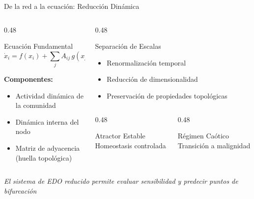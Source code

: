 \documentclass[aspectratio=169]{beamer}
\begin{document}
	\begin{frame}{De la red a la ecuación: Reducción Dinámica}
		\begin{columns}[T]
			\begin{column}{0.48\textwidth}
				\begin{block}{\color{primaryblue}Ecuación Fundamental}
					\begin{equation*}
						\dot{x}_i = f(x_i) + \sum_{j} A_{ij} \, g(x_j, x_i)
					\end{equation*}
				\end{block}
				
				\vspace{0.3cm}
				\textbf{Componentes:}
				\begin{itemize}
					\item Actividad dinámica de la comunidad
					\item Dinámica interna del nodo
					\item Matriz de adyacencia (huella topológica)
				\end{itemize}
			\end{column}
			
			\begin{column}{0.48\textwidth}
				\begin{block}{\color{primaryblue}Separación de Escalas}
					\begin{itemize}
						\item Renormalización temporal
						\item Reducción de dimensionalidad
						\item Preservación de propiedades topológicas
					\end{itemize}
				\end{block}
				
				\vspace{0.3cm}
				\begin{columns}
					\begin{column}{0.48\textwidth}
						\begin{block}{Atractor Estable}
							\footnotesize Homeostasis controlada
						\end{block}
					\end{column}
					\begin{column}{0.48\textwidth}
						\begin{alertblock}{Régimen Caótico}
							\footnotesize Transición a malignidad
						\end{alertblock}
					\end{column}
				\end{columns}
			\end{column}
		\end{columns}
		
		\vspace{0.2cm}
		\begin{center}
			\footnotesize \textit{\color{secondaryblue}El sistema de EDO reducido permite evaluar sensibilidad y predecir puntos de bifurcación}
		\end{center}
	\end{frame}
	
\end{document}
